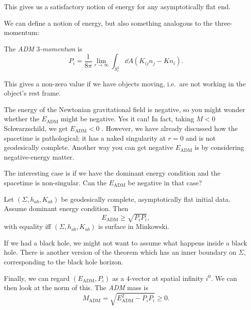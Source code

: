 This gives us a satisfactory notion of energy for any asymptotically flat end.

We can define a notion of energy, but also something analogous to the three-momentum:
\begin{definition}
  The \emph{ADM $3$-momentum} is 
  \begin{equation}
    P_i = \frac{1}{8 \pi} \lim_{r \to \infty} \int_{S_r^2}  \dd{A} (K_{ij} n_{j} - K n_{i}).
  \end{equation}
\end{definition}
This gives a non-zero value if we have objects moving, i.e.~are not working in the object's rest frame.

The energy of the Newtonian gravitational field is negative, so you might wonder whether the $E_{\text{ADM}}$ might be negative. Yes it can!
In fact, taking $M <0$ Schwarzschild, we get $E_{\text{ADM}}< 0$ .
However, we have already discussed how the spacetime is pathological; it has a naked singularity at $r  = 0$ and is not geodesically complete.
Another way you can get negative $E_{\text{ADM}}$ is by considering negative-energy matter.

The interesting case is if we have the dominant energy condition and the spacetime is non-singular. Can the $E_{\text{ADM}}$ be negative in that case?
\begin{theorem}
  Let $(\Sigma, h_{ab}, K_{ab})$ be geodesically complete, asymptotically flat initial data.
  Assume dominant energy condition. 
  Then
  \begin{equation}
    E_{\text{ADM}} \geq \sqrt{P_{i} P_{i}},
  \end{equation}
  with equality iff $(\Sigma, h_{ab}, K_{ab})$ is surface in Minkowski.
\end{theorem}

If we had a black hole, we might not want to assume what happens inside a black hole.
There is another version of the theorem which has an inner boundary on $\Sigma$, corresponding to the black hole horizon.

\begin{definition}
  Finally, we can regard $(E_{\text{ADM}}, P_i)$ as a $4$-vector at spatial infinity $i^0$.  We can then look at the norm of this.
  The \emph{ADM} mass is
  \begin{equation}
    M_{\text{ADM}} = \sqrt{E_{\text{ADM}}^2 - P_{i} P_{i}} \geq 0.
  \end{equation}
\end{definition}

